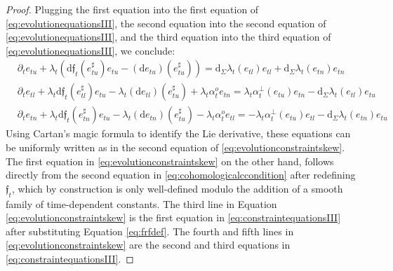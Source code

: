 \documentclass[10pt,reqno,a4paper]{amsart}
\theoremstyle{plain}
\theoremstyle{definition}
\theoremstyle{remark}
\theoremstyle{remark}
\def\dd{\mathrm{d}}
\renewcommand{\(}{ (}
\renewcommand{\)}{ )}
\newcommand{\frf}{\mathfrak{f}}
\begin{document}
\begin{proof}
\noindent
Plugging the first equation into the first equation of \eqref{eq:evolutionequationsIII}, the second equation into the second equation of  \eqref{eq:evolutionequationsIII}, and the third equation into the third equation of  \eqref{eq:evolutionequationsIII}, we conclude:
\begin{eqnarray*}
	&   \partial_t e_{tu} + \lambda_t (\dd\frf_t(e_{tu}^{\sharp}) e_{tu}  - (\dd e_{tu})(e_{tu}^{\sharp})) =    \dd_{\Sigma} \lambda_t (e_{tl}) e_{tl} +   \dd_{\Sigma} \lambda_t (e_{tn}) e_{tn} \nonumber \\
	&   \partial_t e_{tl}  + \lambda_t \dd\frf_t(e_{tl}^{\sharp})  e_{tu}   - \lambda_t (\dd e_{tl})(e_{tu}^{\sharp}) + \lambda_t\alpha^o_t e_{tn}  = \lambda_t \alpha^{\perp}_t(e_{tu}) e_{tn}   -   \dd_{\Sigma} \lambda_t (e_{tl}) e_{tu}     \\
	&  \partial_t e_{tn} + \lambda_t  \dd\frf_t(e_{tn}^{\sharp})  e_{tu}  -  \lambda_t (\dd e_{tn})(e_{tu}^{\sharp})   - \lambda_t \alpha^o_t e_{tl} =   - \lambda_t \alpha^{\perp}_t (e_{tu}) e_{tl} -   \dd_{\Sigma} \lambda_t (e_{tn}) e_{tu}   
\end{eqnarray*}
Using Cartan's magic formula to identify the Lie derivative, these equations can be uniformly written as in the second equation of \eqref{eq:evolutionconstraintskew}. The first equation in \eqref{eq:evolutionconstraintskew} on the other hand, follows directly from the second equation in \eqref{eq:cohomologicalccondition} after redefining $\frf_t$, which by construction is only well-defined modulo the addition of a smooth family of time-dependent constants. The third line in Equation \eqref{eq:evolutionconstraintskew} is the first equation in \eqref{eq:constraintequationsIII} after substituting Equation \eqref{eq:frfdef}. The fourth and fifth lines in \eqref{eq:evolutionconstraintskew} are the second and third equations in \eqref{eq:constraintequationsIII}.   


\end{proof}
\end{document}
